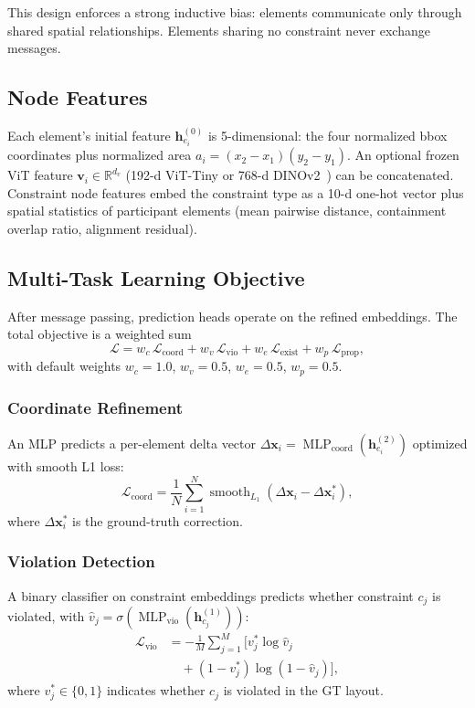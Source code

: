 \documentclass[conference]{IEEEtran}
\begin{document}
This design enforces a strong inductive bias: elements communicate only
through shared spatial relationships. Elements sharing no constraint never
exchange messages.

\subsection{Node Features}
Each element's initial feature $\mathbf{h}_{e_i}^{(0)}$ is 5-dimensional: the
four normalized bbox coordinates plus normalized area
$a_i=(x_2-x_1)(y_2-y_1)$. An optional frozen ViT feature
$\mathbf{v}_i\in\mathbb{R}^{d_v}$ (192-d ViT-Tiny or 768-d
DINOv2~\cite{oquab2024dinov2}) can be concatenated. Constraint node features
embed the constraint type as a 10-d one-hot vector plus spatial statistics of
participant elements (mean pairwise distance, containment overlap ratio,
alignment residual).

\subsection{Multi-Task Learning Objective}
After message passing, prediction heads operate on the refined embeddings.
The total objective is a weighted sum
\begin{equation}
\mathcal{L}=w_c\,\mathcal{L}_{\text{coord}}+w_v\,\mathcal{L}_{\text{vio}}
+w_e\,\mathcal{L}_{\text{exist}}+w_p\,\mathcal{L}_{\text{prop}},
\label{eq:loss}
\end{equation}
with default weights $w_c{=}1.0$, $w_v{=}0.5$, $w_e{=}0.5$, $w_p{=}0.5$.

\subsubsection{Coordinate Refinement}
An MLP predicts a per-element delta vector
$\Delta\mathbf{x}_i=\operatorname{MLP}_{\text{coord}}(\mathbf{h}_{e_i}^{(2)})$
optimized with smooth L1 loss:
\begin{equation}
\mathcal{L}_{\text{coord}}=\frac{1}{N}\sum_{i=1}^{N}
\operatorname{smooth}_{L_1}(\Delta\mathbf{x}_i-\Delta\mathbf{x}_i^*),
\label{eq:lcoord}
\end{equation}
where $\Delta\mathbf{x}_i^*$ is the ground-truth correction.

\subsubsection{Violation Detection}
A binary classifier on constraint embeddings predicts whether constraint
$c_j$ is violated, with $\hat{v}_j=\sigma(\operatorname{MLP}_{\text{vio}}
(\mathbf{h}_{c_j}^{(1)}))$:
\begin{equation}
\begin{aligned}
\mathcal{L}_{\text{vio}} &= -\frac{1}{M}\sum_{j=1}^{M}\bigl[v_j^*\log\hat{v}_j \\
&\quad +(1-v_j^*)\log(1-\hat{v}_j)\bigr],
\end{aligned}
\label{eq:lvio}
\end{equation}
where $v_j^*\in\{0,1\}$ indicates whether $c_j$ is violated in the GT layout.
\end{document}

